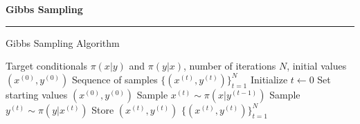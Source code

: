 \begin{frame}
	\vspace{2cm}
	\begin{center}
		{\Huge\textbf{\textcolor{copenhagenred}{Gibbs Sampling}}}
		\vspace{1cm}

		\rule{4cm}{3pt}
		\vspace{2cm}
	\end{center}
\end{frame}

\begin{frame}{Gibbs Sampling Algorithm}
    \begin{algorithm}[H]
        \caption{2D Gibbs Sampler with Systematic Scan}
        \begin{algorithmic}[1]
            \REQUIRE Target conditionals $\pi(x|y)$ and $\pi(y|x)$, number of iterations $N$, initial values $(x^{(0)}, y^{(0)})$
            \ENSURE Sequence of samples $\{(x^{(t)}, y^{(t)})\}_{t=1}^N$
            \STATE Initialize $t \leftarrow 0$
            \STATE Set starting values $(x^{(0)}, y^{(0)})$
                \STATE Sample $x^{(t)} \sim \pi(x | y^{(t-1)})$
                \STATE Sample $y^{(t)} \sim \pi(y | x^{(t)})$
                \STATE Store $(x^{(t)}, y^{(t)})$
            \ENDFOR
            \RETURN $\{(x^{(t)}, y^{(t)})\}_{t=1}^N$
        \end{algorithmic}
    \end{algorithm}
\end{frame}



